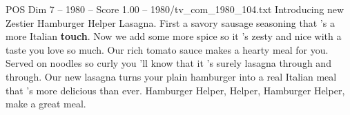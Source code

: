 \begin{textsample}{POS Dim 7 – 1980 – Score 1.00 – 1980/tv\_com\_1980\_104.txt}  \label{ex:f7_pos_046}
Introducing new Zestier Hamburger Helper Lasagna.
First a savory sausage seasoning that 's a more Italian \textbf{touch}.
Now we add some more spice so it 's zesty and nice with a taste you love so much.
Our rich tomato sauce makes a hearty meal for you.
Served on noodles so curly you 'll know that it 's surely lasagna through and through.
Our new lasagna turns your plain hamburger into a real Italian meal that 's more delicious than ever.
Hamburger Helper, Helper, Hamburger Helper, make a great meal.

\end{textsample}
